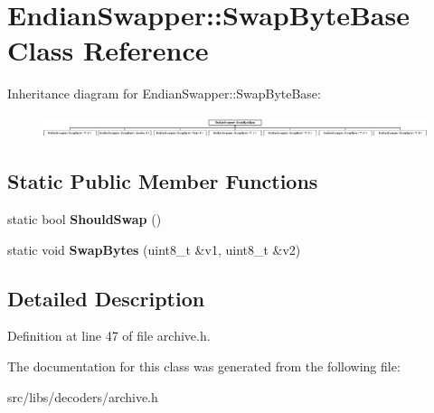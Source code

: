 \hypertarget{classEndianSwapper_1_1SwapByteBase}{\section{Endian\-Swapper\-:\-:Swap\-Byte\-Base Class Reference}
\label{classEndianSwapper_1_1SwapByteBase}
}
Inheritance diagram for Endian\-Swapper\-:\-:Swap\-Byte\-Base\-:\begin{figure}[H]
\begin{center}
\leavevmode
\includegraphics[height=0.642570cm]{classEndianSwapper_1_1SwapByteBase}
\end{center}
\end{figure}
\subsection*{Static Public Member Functions}
\begin{DoxyCompactItemize}
\item 
\hypertarget{classEndianSwapper_1_1SwapByteBase_a32ba5465220301c4d1d7611cd3ee4064}{static bool {\bfseries Should\-Swap} ()}\label{classEndianSwapper_1_1SwapByteBase_a32ba5465220301c4d1d7611cd3ee4064}

\item 
\hypertarget{classEndianSwapper_1_1SwapByteBase_ad71f6b6790d501184d1a97e220917e60}{static void {\bfseries Swap\-Bytes} (uint8\-\_\-t \&v1, uint8\-\_\-t \&v2)}\label{classEndianSwapper_1_1SwapByteBase_ad71f6b6790d501184d1a97e220917e60}

\end{DoxyCompactItemize}


\subsection{Detailed Description}


Definition at line 47 of file archive.\-h.



The documentation for this class was generated from the following file\-:\begin{DoxyCompactItemize}
\item 
src/libs/decoders/archive.\-h\end{DoxyCompactItemize}
